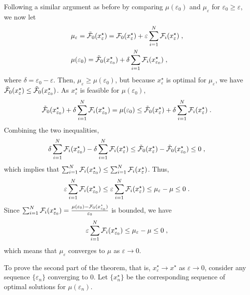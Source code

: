 \documentclass[journal,twoside,web]{ieeecolor}
\begin{document}
Following a similar argument as before by comparing $\mu(\varepsilon_0)$ and $\mu_\varepsilon$ for $\varepsilon_0\geq \varepsilon$, we now let
\begin{align*}
&\mu_\varepsilon=\tilde{{\cal F}}_0(x^\star_\varepsilon)={\cal F}_0(x^\star_\varepsilon)+\varepsilon\sum_{i=1}^N{\cal F}_i(x^\star_\varepsilon)\;,\\
&\mu(\varepsilon_0)=\tilde{{\cal F}}_0(x^\star_{\varepsilon_0})+\delta\sum_{i=1}^N{\cal F}_i(x^\star_{\varepsilon_0})\;,
\end{align*}
where $\delta=\varepsilon_0-\varepsilon$. Then, $\mu_\varepsilon\geq \mu(\varepsilon_0)$\;,
but because $x_\varepsilon^\star$ is optimal for $\mu_\varepsilon$\;, we have
$\tilde{{\cal F}}_0(x^\star_\varepsilon)\leq \tilde{{\cal F}}_0(x^\star_{\varepsilon_0})$.
As $x^\star_\varepsilon$ is feasible for $\mu(\varepsilon_0)$, \begin{align*}
\tilde{{\cal F}}_0(x^\star_{\varepsilon_0})+\delta\sum_{i=1}^N{\cal F}_i(x^\star_{\varepsilon_0})=\mu(\varepsilon_0)\leq \tilde{{\cal F}}_0(x^\star_{\varepsilon})+\delta\sum_{i=1}^N{\cal F}_i(x^\star_{\varepsilon})\;.
\end{align*}
Combining the two inequalities,
\begin{align*}
\delta\sum_{i=1}^N{\cal F}_i(x^\star_{\varepsilon_0})-\delta\sum_{i=1}^N{\cal F}_i(x^\star_{\varepsilon})\leq \tilde{{\cal F}}_0(x^\star_{\varepsilon})-\tilde{{\cal F}}_0(x^\star_{\varepsilon_0})\leq 0\;,
\end{align*}
which implies that $\sum_{i=1}^N{\cal F}_i(x^\star_{\varepsilon_0})\leq \sum_{i=1}^N{\cal F}_i(x^\star_{\varepsilon})$. Thus,
\begin{equation}\label{limi.eq}
\varepsilon\sum_{i=1}^N{\cal F}_{i}(x_{\varepsilon_0}^\star)\leq
\varepsilon\sum_{i=1}^N{\cal F}_{i}(x_{\varepsilon}^\star)\leq
\mu_\varepsilon-\mu \leq 0\;.
\end{equation}
Since $\sum_{i=1}^N{\cal F}_{i}(x_{\varepsilon_0}^\star)=\frac{\mu(\varepsilon_0)-{\cal F}_0(x^\star_{\varepsilon_0})}{\varepsilon_0}$ is bounded, we have
\begin{equation}\label{limi2.eq}
\varepsilon\sum_{i=1}^N{\cal F}_{i}(x_{\varepsilon_0}^\star)\leq
\mu_\varepsilon-\mu\leq 0\;,
\end{equation}
which means that $\mu_\varepsilon$ converges to $\mu$ as $\varepsilon\to 0$.

To prove the second part of the theorem, that is, $x^\star_\varepsilon \to x^\star$ as $\varepsilon \to 0$, consider any sequence $\{\varepsilon_n\}$ converging to $0$. Let $\{x^\star_{n}\}$ be the corresponding sequence of optimal solutions for $\mu(\varepsilon_n)$.
\end{document}
